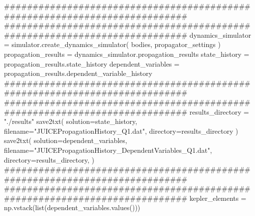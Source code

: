 {}###########################################################################\markdownRendererInterblockSeparator
{}
\markdownRendererSectionEnd \markdownRendererSectionBegin
{}\markdownRendererInterblockSeparator
{}###########################################################################\markdownRendererInterblockSeparator
{}
\markdownRendererSectionEnd \markdownRendererSectionBegin
{}\markdownRendererInterblockSeparator
{}dynamics_simulator = simulator.create_dynamics_simulator( bodies, propagator_settings )\markdownRendererInterblockSeparator
{}
\markdownRendererSectionEnd \markdownRendererSectionBegin
{}\markdownRendererInterblockSeparator
{}propagation_results = dynamics_simulator.propagation_results\markdownRendererInterblockSeparator
{}
\markdownRendererSectionEnd \markdownRendererSectionBegin
{}\markdownRendererInterblockSeparator
{}state_history = propagation_results.state_history dependent_variables = propagation_results.dependent_variable_history\markdownRendererInterblockSeparator
{}###########################################################################\markdownRendererInterblockSeparator
{}
\markdownRendererSectionEnd \markdownRendererSectionBegin
{}\markdownRendererInterblockSeparator
{}########################################################################### results_directory = "./results" save2txt( solution=state_history, filename="JUICEPropagationHistory_Q1.dat", directory=results_directory ) save2txt( solution=dependent_variables, filename="JUICEPropagationHistory_DependentVariables_Q1.dat", directory=results_directory, )\markdownRendererInterblockSeparator
{}###########################################################################\markdownRendererInterblockSeparator
{}
\markdownRendererSectionEnd \markdownRendererSectionBegin
{}\markdownRendererInterblockSeparator
{}###########################################################################\markdownRendererInterblockSeparator
{}
\markdownRendererSectionEnd \markdownRendererSectionBegin
{}\markdownRendererInterblockSeparator
{}kepler_elements = np.vstack(list(dependent_variables.values()))\markdownRendererInterblockSeparator
{}
\markdownRendererSectionEnd \markdownRendererSectionBegin
